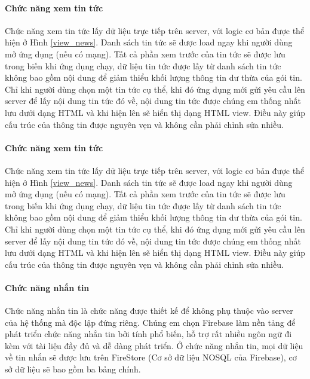 \paragraph{Chức năng xem tin tức}
\mbox{}

Chức năng xem tin tức lấy dữ liệu trực tiếp trên server, với logic cơ bản được thể hiện ở Hình \ref{view_news}. 
Danh sách tin tức sẽ được load ngay khi người dùng mở ứng dụng (nếu có mạng). Tất cả phần xem trước của tin tức sẽ được lưu
trong biến khi ứng dụng chạy, dữ liệu tin tức được lấy từ danh sách tin tức không bao gồm nội dung để giảm thiểu khối lượng
thông tin dư thừa của gói tin. Chỉ khi người dùng chọn một tin tức cụ thể, khi đó ứng dụng mới gửi yêu cầu lên server để lấy
nội dung tin tức đó về, nội dung tin tức được chúng em thống nhất lưu dưới dạng HTML và khi hiện lên sẽ hiển thị dạng HTML view.
Điều này giúp cấu trúc của thông tin được nguyên vẹn và không cần phải chỉnh sửa nhiều.



\paragraph{Chức năng xem tin tức}
\mbox{}

Chức năng xem tin tức lấy dữ liệu trực tiếp trên server, với logic cơ bản được thể hiện ở Hình \ref{view_news}. 
Danh sách tin tức sẽ được load ngay khi người dùng mở ứng dụng (nếu có mạng). Tất cả phần xem trước của tin tức sẽ được lưu
trong biến khi ứng dụng chạy, dữ liệu tin tức được lấy từ danh sách tin tức không bao gồm nội dung để giảm thiểu khối lượng
thông tin dư thừa của gói tin. Chỉ khi người dùng chọn một tin tức cụ thể, khi đó ứng dụng mới gửi yêu cầu lên server để lấy
nội dung tin tức đó về, nội dung tin tức được chúng em thống nhất lưu dưới dạng HTML và khi hiện lên sẽ hiển thị dạng HTML view.
Điều này giúp cấu trúc của thông tin được nguyên vẹn và không cần phải chỉnh sửa nhiều.


\paragraph{Chức năng nhắn tin}
\mbox{}

Chức năng nhắn tin là chức năng được thiết kế để không phụ thuộc vào server của hệ thống mà độc lập đứng riêng. Chúng em
chọn Firebase làm nền tảng để phát triển chức năng nhắn tin bởi tính phổ biến, hỗ trợ rất nhiều ngôn ngữ đi kèm với tài liệu đầy đủ 
và dễ dàng phát triển.
Ở chức năng nhắn tin, mọi dữ liệu về tin nhắn sẽ được lưu trên FireStore (Cơ sở dữ liệu NOSQL của Firebase), cơ sở dữ liệu sẽ
bao gồm ba bảng chính. 

